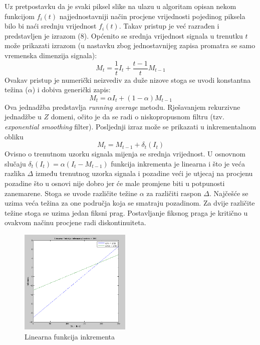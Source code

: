 \documentclass[a4paper,twocolumn]{article}
\begin{document}
Uz pretpostavku da je svaki piksel slike na ulazu u algoritam opisan nekom
funkcijom \(f_i(t)\) najjednostavniji način procjene vrijednosti pojedinog
piksela bilo bi naći srednju vrijednost \(f_i(t)\). Takav pristup je već
razrađen i predstavljen je izrazom (8). Općenito se srednja vrijednost signala
u trenutku \(t\) može prikazati izrazom (u nastavku zbog jednostavnijeg zapisa
promatra se samo vremenska dimenzija signala):
\begin{equation}
M_t = \frac{1}{t}I_t + \frac{t-1}{t} M_{t-1}
\end{equation}
Ovakav pristup je numerički neizvediv za duže nizove stoga se uvodi konstantna
težina (\(\alpha\)) i dobiva generički zapis:
\begin{equation}
M_t = \alpha I_t + (1 - \alpha)M_{t-1}
\end{equation}
Ova jednadžba predstavlja \textit{running average} metodu. Rješavanjem
rekurzivne jednadžbe u \(Z\) domeni, očito je da se radi o niskopropusnom
filtru (tzv. \textit{exponential smoothing} filter).
Posljednji izraz može se  prikazati u inkrementalnom obliku
\begin{equation}
M_t = M_{t-1} + \delta_t(I_t)
\end{equation}
Ovisno o trenutnom uzorku signala mijenja se srednja vrijednost. U osnovnom
slučaju \(\delta_t(I_t) = \alpha(I_t - M_{t-1})\) funkcija inkrementa je linearna
i što je veća razlika \(\Delta\) između trenutnog uzorka signala i pozadine veći
je utjecaj na procjenu pozadine što u osnovi nije dobro jer će male promjene
biti u potpunosti zanemarene. Stoga se uvode različite težine \(\alpha\) za
različiti raspon \(\Delta\). Najčešće se uzima veća težina za one područja
koja se smatraju pozadinom. Za dvije različite težine stoga se uzima jedan
fiksni prag. Postavljanje fiksnog praga je kritično u ovakvom načinu procjene
radi diskontinuiteta.

\begin{figure}[htb]
\begin{center}
\includegraphics[height=5cm]{afina1.png}
\caption{Linearna funkcija inkrementa}
\end{center}
\end{figure}
\end{document}
